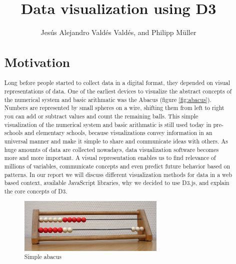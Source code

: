 \documentclass{bioinfo}
\begin{document}

\title[short Title]{Data visualization using D3}
\author[Data visualization using D3]{Jes\'us Alejandro Vald\'es Vald\'es, and Philipp M\"uller}
\address{}
\history{}
\editor{}

\maketitle

\begin{abstract}
\section{Motivation}
\newline
Long before people started to collect data in a digital format, they depended on visual representations of data.
One of the earliest devices to visualize the abstract concepts of the numerical system and basic arithmatic was the Abacus (figure \ref{fig:abacus}). %
Numbers are represented by small spheres on a wire, shifting them from left to right you can add or subtract values and count the remaining balls.
This simple visualization of the numerical system and basic arithmatic is still used today in pre-schools and elementary schools, because visualizations convey information in an universal manner and make it simple to share and communicate ideas with others.
\newline
As huge amounts of data are collected nowadays, data visualization software becomes more and more important. A visual representation enables us to find relevance of millions of variables, communicate concepts and even predict future behavior based on patterns.
\newline
In our report we will discuss different visualization methods for data in a web based context, available JavaScript libraries, why we decided to use D3.js, and explain the core concepts of D3.

\begin{figure}[!tpb]
\centerline{\includegraphics[width=70mm]{abacus.jpg}}
\caption{Simple abacus}\label{fig:abacus}
\end{figure}


\end{abstract}
\end{document}

